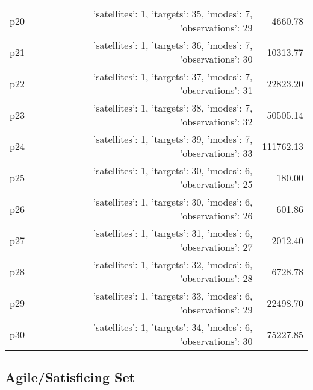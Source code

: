 \documentclass{article}
\begin{document}
\begin{center}
\begin{tabular}{@{}l|r|r@{}}
  p20&{'satellites': 1, 'targets': 35, 'modes': 7, 'observations': 29}&4660.78\\
  p21&{'satellites': 1, 'targets': 36, 'modes': 7, 'observations': 30}&10313.77\\
  p22&{'satellites': 1, 'targets': 37, 'modes': 7, 'observations': 31}&22823.20\\
  p23&{'satellites': 1, 'targets': 38, 'modes': 7, 'observations': 32}&50505.14\\
  p24&{'satellites': 1, 'targets': 39, 'modes': 7, 'observations': 33}&111762.13\\
  p25&{'satellites': 1, 'targets': 30, 'modes': 6, 'observations': 25}&180.00\\
  p26&{'satellites': 1, 'targets': 30, 'modes': 6, 'observations': 26}&601.86\\
  p27&{'satellites': 1, 'targets': 31, 'modes': 6, 'observations': 27}&2012.40\\
  p28&{'satellites': 1, 'targets': 32, 'modes': 6, 'observations': 28}&6728.78\\
  p29&{'satellites': 1, 'targets': 33, 'modes': 6, 'observations': 29}&22498.70\\
  p30&{'satellites': 1, 'targets': 34, 'modes': 6, 'observations': 30}&75227.85
                            \end{tabular}
                            \end{center}
                    

                                \subsection*{Agile/Satisficing Set}
                                
\end{document}
